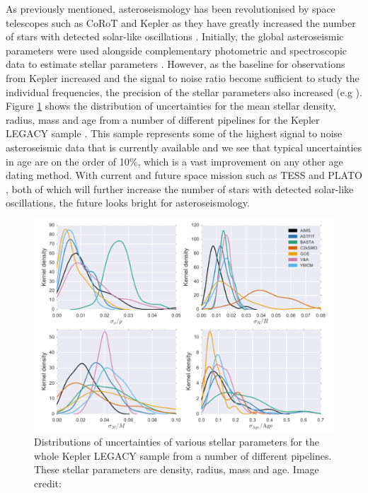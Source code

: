 As previously mentioned, asteroseismology has been revolutionised by space telescopes such as CoRoT and Kepler as they have greatly increased the number of stars with detected solar-like oscillations \citep{Chaplin_etal_2011}. Initially, the global asteroseismic parameters were used alongside complementary photometric and spectroscopic data to estimate stellar parameters \citep{Chaplin_etal_2014}. However, as the baseline for observations from Kepler increased and the signal to noise ratio become sufficient to study the individual frequencies, the precision of the stellar parameters also increased (e.g \citealt{Silva_Aguirre_etal_2015}). Figure \ref{fig:VSA_legacy_uncertainties} shows the distribution of uncertainties for the mean stellar density, radius, mass and age from a number of different pipelines for the Kepler LEGACY sample \citep{Lund_etal_2017}. This sample represents some of the highest signal to noise asteroseismic data that is currently available and we see that typical uncertainties in age are on the order of 10\%, which is a vast improvement on any other age dating method. With current and future space mission such as TESS \citep{Ricker_etal_2015} and PLATO \citep{Rauer_etal_2014}, both of which will further increase the number of stars with detected solar-like oscillations, the future looks bright for asteroseismology.

\begin{figure}
    \centering
    \includegraphics[scale=0.4]{Figures/1-Introduction/silva_aguirre_2017_legacy.pdf}
    \caption[Distributions of uncertainties in asteroseismically determined parameters]{Distributions of uncertainties of various stellar parameters for the whole Kepler LEGACY sample from a number of different pipelines. These stellar parameters are density, radius, mass and age. Image credit: \citet{Silva_Aguirre_etal_2017}}
    \label{fig:VSA_legacy_uncertainties}
\end{figure}

